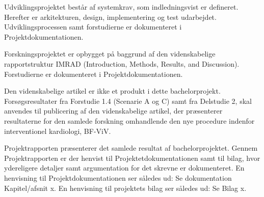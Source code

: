 Udviklingsprojektet består af systemkrav, som indledningsvist er defineret. Herefter er arkitekturen, design, implementering og test udarbejdet. Udviklingsprocessen samt forstudierne er dokumenteret i Projektdokumentationen.

Forskningsprojektet er opbygget på baggrund af den videnskabelige rapportstruktur IMRAD (Introduction, Methods, Results, and Discussion). Forstudierne er dokumenteret i Projektdokumentationen.       

Den videnskabelige artikel er ikke et produkt i dette bachelorprojekt. Forsøgsresultater fra Forstudie 1.4 (Scenarie A og C) samt fra Delstudie 2, skal anvendes til publicering af den videnskabelige artikel, der præsenterer resultaterne for den samlede forskning omhandlende den nye procedure indenfor interventionel kardiologi, BF-ViV. 

Projektrapporten præsenterer det samlede resultat af bachelorprojektet. Gennem Projektrapporten er der henvist til Projektetdokumentationen samt til bilag, hvor ydereligere detaljer samt argumentation for det skrevne er dokumenteret. En henvisning til Projektdokumentationen ser således ud: Se dokumentation Kapitel/afsnit x. En henvisning til projektets bilag ser således ud: Se Bilag x.  
    

